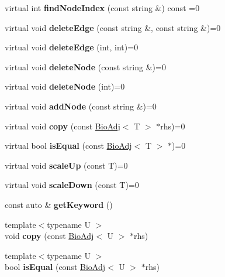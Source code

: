 \begin{DoxyCompactItemize}
\mbox{\label{class_bio_adj_ab6a4252e06dcd04ab5fc3fd93765dff2}} 
virtual int {\bfseries find\+Node\+Index} (const string \&) const =0
\item 
\mbox{\label{class_bio_adj_ab80a3d3792670fdf6afbee2efe449433}} 
virtual void {\bfseries delete\+Edge} (const string \&, const string \&)=0
\item 
\mbox{\label{class_bio_adj_aab6e36e1bc6de746f7714a1627b2074d}} 
virtual void {\bfseries delete\+Edge} (int, int)=0
\item 
\mbox{\label{class_bio_adj_a549d96f7306ac6a74f4ec10423a2da95}} 
virtual void {\bfseries delete\+Node} (const string \&)=0
\item 
\mbox{\label{class_bio_adj_a1d620a89793f3f4af60e07fbf848c7b1}} 
virtual void {\bfseries delete\+Node} (int)=0
\item 
\mbox{\label{class_bio_adj_a24737d6b6867062e03cedd1dcccdeaa6}} 
virtual void {\bfseries add\+Node} (const string \&)=0
\item 
\mbox{\label{class_bio_adj_af7ec8cf68fa80bfe192ddee065a00b22}} 
virtual void {\bfseries copy} (const \hyperlink{class_bio_adj}{Bio\+Adj}$<$ T $>$ $\ast$rhs)=0
\item 
\mbox{\label{class_bio_adj_a6553d8cf9317f0f6553e626839cc41e9}} 
virtual bool {\bfseries is\+Equal} (const \hyperlink{class_bio_adj}{Bio\+Adj}$<$ T $>$ $\ast$)=0
\item 
\mbox{\label{class_bio_adj_acebd2c08806e7c42fe9b58dcaf7fdc29}} 
virtual void {\bfseries scale\+Up} (const T)=0
\item 
\mbox{\label{class_bio_adj_a9fa6051fb10352bd89f0dab29787dff6}} 
virtual void {\bfseries scale\+Down} (const T)=0
\item 
\mbox{\label{class_bio_adj_af1e70e3ea88acd3de861d60ad9997ff0}} 
const auto \& {\bfseries get\+Keyword} ()
\item 
\mbox{\label{class_bio_adj_aa5e3374c3c4e26f2d0339baadeba29a4}} 
{\footnotesize template$<$typename U $>$ }\\void {\bfseries copy} (const \hyperlink{class_bio_adj}{Bio\+Adj}$<$ U $>$ $\ast$rhs)
\item 
\mbox{\label{class_bio_adj_ad36832230f726734c44b78935994e33c}} 
{\footnotesize template$<$typename U $>$ }\\bool {\bfseries is\+Equal} (const \hyperlink{class_bio_adj}{Bio\+Adj}$<$ U $>$ $\ast$rhs)
\end{DoxyCompactItemize}

